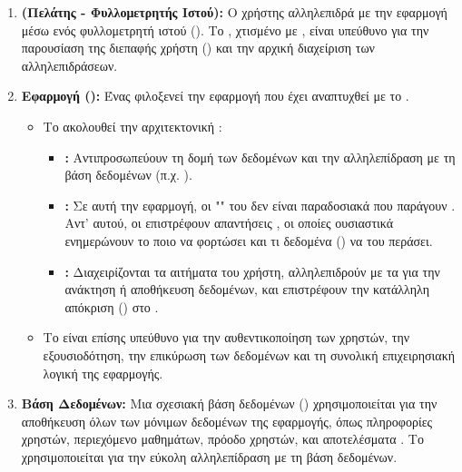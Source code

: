 \begin{enumerate}[leftmargin=*, noitemsep]
    \item \textbf{ (Πελάτης - Φυλλομετρητής Ιστού):} Ο χρήστης αλληλεπιδρά με την εφαρμογή μέσω ενός φυλλομετρητή ιστού (). Το , χτισμένο με , είναι υπεύθυνο για την παρουσίαση της διεπαφής χρήστη () και την αρχική διαχείριση των αλληλεπιδράσεων.

    \item \textbf{ Εφαρμογή ():} Ένας φιλοξενεί την  εφαρμογή που έχει αναπτυχθεί με το .
    \begin{itemize}[leftmargin=+, noitemsep]
        \item Το  ακολουθεί την αρχιτεκτονική :
        \begin{itemize}[leftmargin=++, noitemsep]
            \item \textbf{:} Αντιπροσωπεύουν τη δομή των δεδομένων και την αλληλεπίδραση με τη βάση δεδομένων (π.χ. ).
            \item \textbf{:} Σε αυτή την εφαρμογή, οι "" του  δεν είναι παραδοσιακά  που παράγουν . Αντ' αυτού, οι  επιστρέφουν απαντήσεις , οι οποίες ουσιαστικά ενημερώνουν το  ποιο  να φορτώσει και τι δεδομένα () να του περάσει.
            \item \textbf{:} Διαχειρίζονται τα αιτήματα του χρήστη, αλληλεπιδρούν με τα  για την ανάκτηση ή αποθήκευση δεδομένων, και επιστρέφουν την κατάλληλη απόκριση () στο .
        \end{itemize}
        \item Το  είναι επίσης υπεύθυνο για την αυθεντικοποίηση των χρηστών, την εξουσιοδότηση, την επικύρωση των δεδομένων και τη συνολική επιχειρησιακή λογική της εφαρμογής.
    \end{itemize}

    \item \textbf{Βάση Δεδομένων:} Μια σχεσιακή βάση δεδομένων () χρησιμοποιείται για την αποθήκευση όλων των μόνιμων δεδομένων της εφαρμογής, όπως πληροφορίες χρηστών, περιεχόμενο μαθημάτων, πρόοδο χρηστών, και αποτελέσματα . Το  χρησιμοποιείται για την εύκολη αλληλεπίδραση με τη βάση δεδομένων.


\end{enumerate}
